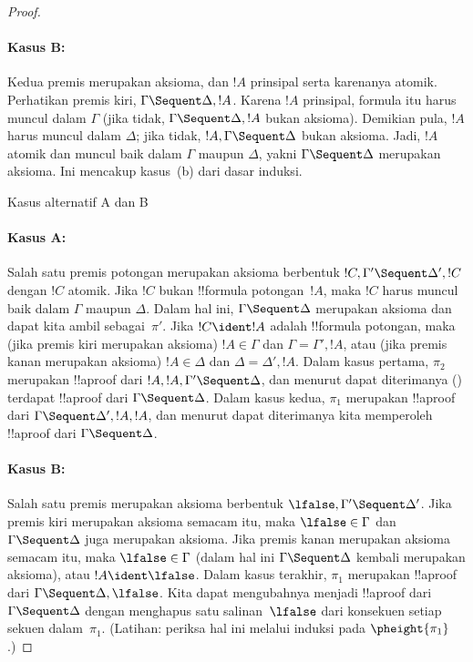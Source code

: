 \documentclass[../../../include/open-logic-section]{subfiles}
\begin{document}
\begin{proof}
\paragraph{Kasus B:} Kedua premis merupakan aksioma, dan $!A$ prinsipal
serta karenanya atomik. Perhatikan premis kiri, $\Gamma \Sequent \Delta,
!A$. Karena $!A$ prinsipal, formula itu harus muncul dalam $\Gamma$ (jika
tidak, $\Gamma \Sequent \Delta, !A$ bukan aksioma). Demikian pula, $!A$
harus muncul dalam $\Delta$; jika tidak, $!A, \Gamma \Sequent \Delta$ bukan
aksioma. Jadi, $!A$ atomik dan muncul baik dalam $\Gamma$ maupun $\Delta$,
yakni $\Gamma \Sequent \Delta$ merupakan aksioma. Ini mencakup kasus~(b)
dari dasar induksi.

\begin{center}
Kasus alternatif A dan B
\end{center}

\paragraph{Kasus A:} Salah satu premis potongan merupakan aksioma berbentuk
$!C, \Gamma' \Sequent \Delta', !C$ dengan $!C$ atomik. Jika $!C$ bukan
!!{formula} potongan~$!A$, maka $!C$ harus muncul baik dalam $\Gamma$ maupun
$\Delta$. Dalam hal ini, $\Gamma \Sequent \Delta$ merupakan aksioma dan
dapat kita ambil sebagai~$\pi'$. Jika $!C \ident !A$ adalah !!{formula}
potongan, maka (jika premis kiri merupakan aksioma) $!A \in \Gamma$ dan
$\Gamma = \Gamma', !A$, atau (jika premis kanan merupakan aksioma) $!A \in
\Delta$ dan $\Delta = \Delta', !A$. Dalam kasus pertama, $\pi_2$ merupakan
!!a{proof} dari $!A, !A, \Gamma' \Sequent \Delta$, dan menurut dapat
diterimanya \LeftR{\Contraction}
() terdapat !!a{proof} dari $\Gamma
\Sequent \Delta$. Dalam kasus kedua, $\pi_1$ merupakan !!a{proof} dari
$\Gamma \Sequent \Delta', !A, !A$, dan menurut dapat diterimanya
\RightR{\Contraction} kita memperoleh !!a{proof} dari $\Gamma \Sequent
\Delta$.

\paragraph{Kasus B:} Salah satu premis merupakan aksioma berbentuk
$\lfalse, \Gamma' \Sequent \Delta'$. Jika premis kiri merupakan aksioma
semacam itu, maka $\lfalse \in \Gamma$ dan $\Gamma \Sequent \Delta$ juga
merupakan aksioma. Jika premis kanan merupakan aksioma semacam itu, maka
$\lfalse \in \Gamma$ (dalam hal ini $\Gamma \Sequent \Delta$ kembali
merupakan aksioma), atau $!A \ident \lfalse$. Dalam kasus terakhir,
$\pi_1$ merupakan !!a{proof} dari $\Gamma \Sequent \Delta, \lfalse$.
Kita dapat mengubahnya menjadi !!a{proof} dari~$\Gamma \Sequent \Delta$
dengan menghapus satu salinan~$\lfalse$ dari konsekuen setiap sekuen
dalam~$\pi_1$. (Latihan: periksa hal ini melalui induksi pada
$\pheight{\pi_1}$.)


\end{proof}
\end{document}
